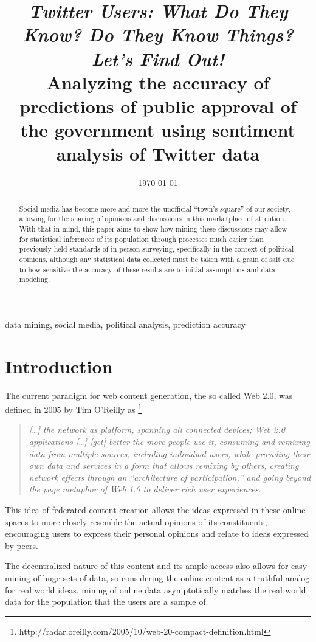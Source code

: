 \documentclass[conference]{IEEEtran}
\author{\IEEEauthorblockN{ Marco Antônio Ribeiro de Toledo \\ RA:\@ 11796419 } \IEEEauthorblockA{ B.Sc. in Computer Science\\ Instituto de Ciências Matemáticas e de Computação\\ University of São Paulo (USP)\\ mardt@usp.br \\ ORCiD: orcid.org/0000-0002-0484-8450}}
\date{\today}
\title{\emph{Twitter Users: What Do They Know? Do They Know Things? Let's Find Out!} \\ {\LARGE Analyzing the accuracy of predictions of public approval of the government using sentiment analysis of Twitter data }}
\begin{document}
\maketitle
\begin{abstract}
Social media has become more and more the unofficial ``town's square'' of our society, allowing for the sharing of opinions and discussions in this marketplace of attention. With that in mind, this paper aims to show how mining these discussions may allow for statistical inferences of its population through processes much easier than previously held standards of in person surveying, specifically in the context of political opinions, although any statistical data collected must be taken with a grain of salt due to how sensitive the accuracy of these results are to initial assumptions and data modeling.
\end{abstract}

\begin{IEEEkeywords}
data mining, social media, political analysis, prediction accuracy
\end{IEEEkeywords}

\section{Introduction}
\label{sec:orga88c40e}
The current paradigm for web content generation, the so called Web 2.0, was defined in 2005 by Tim O'Reilly as \footnote{http://radar.oreilly.com/2005/10/web-20-compact-definition.html}
\begin{quote}
\emph{[\ldots{}] the network as platform, spanning all connected devices; Web 2.0 applications [\ldots{}] [get] better the more people use it, consuming and remixing data from multiple sources, including individual users, while providing their own data and services in a form that allows remixing by others, creating network effects through an “architecture of participation,” and going beyond the page metaphor of Web 1.0 to deliver rich user experiences.}
\end{quote}
This idea of federated content creation allows the ideas expressed in these online spaces to more closely resemble the actual opinions of its constituents, encouraging users to express their personal opinions and relate to ideas expressed by peers.

The decentralized nature of this content and its ample access also allows for easy mining of huge sets of data, so considering the online content as a truthful analog for real world ideas, mining of online data asymptotically matches the real world data for the population that the users are a sample of.
\end{document}
